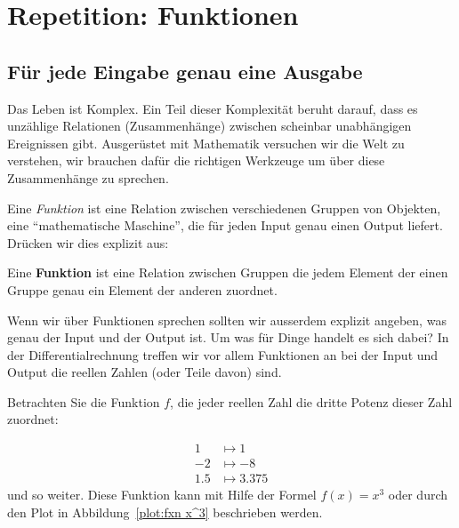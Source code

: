 \chapter{Repetition: Funktionen}

\section{Für jede Eingabe genau eine Ausgabe}

Das Leben ist Komplex. Ein Teil dieser Komplexität beruht darauf, dass es unzählige Relationen (Zusammenhänge) zwischen scheinbar unabhängigen Ereignissen gibt. Ausgerüstet mit Mathematik versuchen wir die Welt zu verstehen, wir brauchen dafür die richtigen Werkzeuge um über diese Zusammenhänge zu sprechen.


Eine \textit{Funktion} ist eine Relation zwischen verschiedenen Gruppen von Objekten, eine ``mathematische Maschine'', die für jeden Input genau einen Output liefert. Drücken wir dies explizit aus:


\begin{definition}
Eine \textbf{Funktion} ist eine Relation zwischen Gruppen die jedem Element der einen Gruppe genau ein Element der anderen zuordnet.
\end{definition}

Wenn wir über Funktionen sprechen sollten wir ausserdem explizit angeben, was genau der Input und der Output ist. Um was für Dinge handelt es sich dabei? In der Differentialrechnung treffen wir vor allem Funktionen an bei der Input und Output die reellen Zahlen (oder Teile davon) sind.




\begin{example}
Betrachten Sie die Funktion $f$, die jeder reellen Zahl die dritte Potenz dieser Zahl zuordnet:

\begin{align*}
1 &\mapsto 1\\
-2 &\mapsto -8\\
1.5 &\mapsto 3.375
\end{align*}
und so weiter. Diese Funktion kann mit Hilfe der Formel $f(x)=x^3$ oder durch den Plot in Abbildung~\ref{plot:fxn x^3} beschrieben werden.
\end{example}

